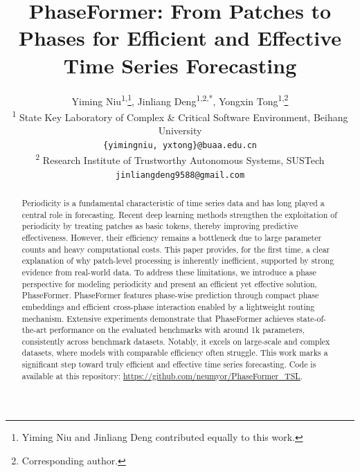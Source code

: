 \documentclass{article} %
\title{PhaseFormer: From Patches to Phases for Efficient and Effective Time Series Forecasting}
\author{
Yiming Niu\textsuperscript{1,}\thanks{Yiming Niu and Jinliang Deng contributed equally to this work.}, Jinliang Deng\textsuperscript{1,2,\textmd{*}}, Yongxin Tong\textsuperscript{1,}\thanks{Corresponding author.}\\
\textsuperscript{1} State Key Laboratory of Complex \& Critical Software Environment, Beihang University\\
\texttt{\{yimingniu, yxtong\}@buaa.edu.cn} \\
\textsuperscript{2} Research Institute of Trustworthy Autonomous Systems, SUSTech\\
\texttt{jinliangdeng9588@gmail.com}
}
\newcommand{\sysname}{PhaseFormer\xspace}
\newcommand{\codeurl}{https://github.com/neumyor/PhaseFormer_TSL}
\newcommand{\revised}[1]{{#1}}
\newcommand{\revised}[1]{{\color{purple}{#1} }}
\begin{document}
\maketitle

\begin{abstract}
Periodicity is a fundamental characteristic of time series data and has long played a central role in forecasting. Recent deep learning methods strengthen the exploitation of periodicity by treating patches as basic tokens, thereby improving predictive effectiveness. However, their efficiency remains a bottleneck due to large parameter counts and heavy computational costs. This paper provides, for the first time, a clear explanation of why patch-level processing is inherently inefficient, supported by strong evidence from real-world data. To address these limitations, we introduce a phase perspective for modeling periodicity and present an efficient yet effective solution, PhaseFormer. 
PhaseFormer features phase-wise prediction through compact phase embeddings and efficient cross-phase interaction enabled by a lightweight routing mechanism. Extensive experiments demonstrate that PhaseFormer achieves state-of-the-art performance \revised{on the evaluated benchmarks} with around 1k parameters, consistently across benchmark datasets. Notably, it excels on large-scale and complex datasets, where models with comparable efficiency often struggle. This work marks a significant step toward truly efficient and effective time series forecasting.
Code is available at this repository: \url{\codeurl}.

\end{abstract}
\end{document}
